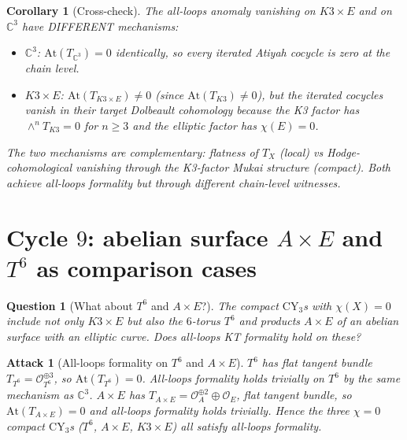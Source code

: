 \documentclass[11pt]{article}
\newtheorem{corollary}[theorem]{Corollary}
\newtheorem{question}[theorem]{Question}
\newtheorem{attack}[theorem]{Attack}
\providecommand{\At}{\mathrm{At}}
\providecommand{\CY}{\mathrm{CY}}
\providecommand{\cO}{\mathcal{O}}
\providecommand{\CC}{\mathbb{C}}
\begin{document}
\begin{corollary}[Cross-check]
\label{cor:local-c3-consistency}
\ClaimStatusTheorem
The all-loops anomaly vanishing on $K3 \times E$ and on $\CC^3$ have
DIFFERENT mechanisms:
\begin{itemize}
\item $\CC^3$: $\At(T_{\CC^3}) = 0$ identically, so every iterated
Atiyah cocycle is zero at the chain level.
\item $K3 \times E$: $\At(T_{K3\times E}) \neq 0$ (since
$\At(T_{K3}) \neq 0$), but the iterated cocycles vanish in their
target Dolbeault cohomology because the K3 factor has
$\wedge^n T_{K3} = 0$ for $n \geq 3$ and the elliptic factor has
$\chi(E) = 0$.
\end{itemize}
The two mechanisms are complementary:  flatness of $T_X$ (local)
vs Hodge-cohomological vanishing through the K3-factor Mukai
structure (compact).  Both achieve all-loops formality but through
different chain-level witnesses.
\end{corollary}

\section{Cycle $9$:  abelian surface $A \times E$ and
$T^6$ as comparison cases}
\label{sec:cycle-9-abelian-comparison}

\begin{question}[What about $T^6$ and $A \times E$?]
\label{q:t6-abelian}
The compact $\CY_3$s with $\chi(X) = 0$ include not only $K3 \times
E$ but also the $6$-torus $T^6$ and products $A \times E$ of an
abelian surface with an elliptic curve.  Does all-loops KT formality
hold on these?
\end{question}

\begin{attack}[All-loops formality on $T^6$ and $A \times E$]
\label{att:t6-ae}
$T^6$ has flat tangent bundle $T_{T^6} = \cO_{T^6}^{\oplus 3}$, so
$\At(T_{T^6}) = 0$.  All-loops formality holds trivially on $T^6$
by the same mechanism as $\CC^3$.  $A \times E$ has $T_{A\times E}
= \cO_A^{\oplus 2} \oplus \cO_E$, flat tangent bundle, so
$\At(T_{A\times E}) = 0$ and all-loops formality holds trivially.
Hence the three $\chi = 0$ compact $\CY_3$s ($T^6$, $A\times E$,
$K3\times E$) all satisfy all-loops formality.
\end{attack}
\end{document}

